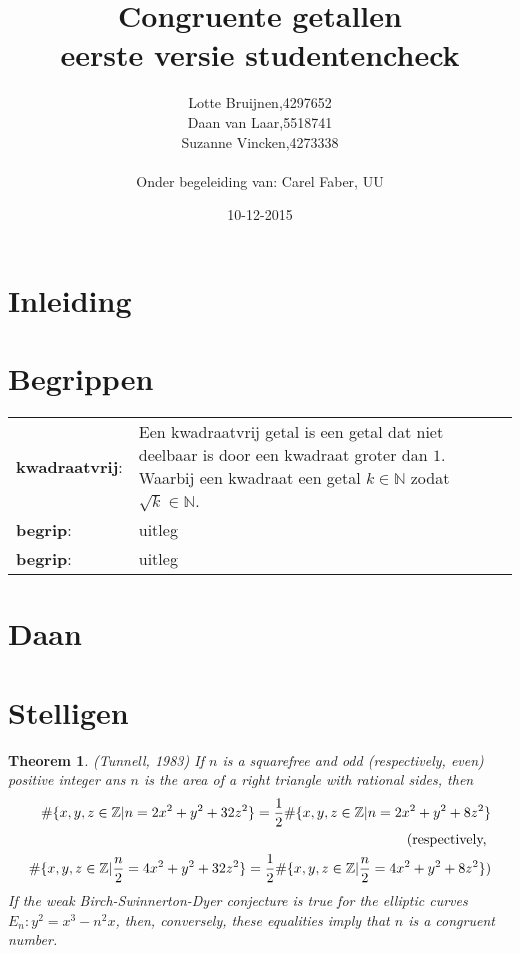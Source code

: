 \documentclass[12pt,reqno]{article}
\title{\textbf{Congruente getallen}\\
		\small{eerste versie studentencheck}}
\author{
	\begin{tabular}{ l l }
		Lotte Bruijnen, & 4297652 \\
		Daan van Laar, & 5518741 \\
		Suzanne Vincken, & 4273338
	\end{tabular}\\
	Onder begeleiding van: Carel Faber, UU
}
\date{10-12-2015}
\newcommand*{\NN}{\ensuremath{\mathbb{N}}}
\newcommand*{\ZZ}{\ensuremath{\mathbb{Z}}}
\begin{document}
	
	\maketitle
	\allowdisplaybreaks
	
	\section{Inleiding}
	
	\section{Begrippen}
	\begin{tabular}{ l p{10cm} }
		\textbf{kwadraatvrij}: \cite{Beukers} & Een kwadraatvrij getal is een getal dat niet deelbaar is door een kwadraat groter dan $1$. Waarbij een kwadraat een getal $k\in\NN$ zodat $\sqrt{k}\in\NN$.\\
		\textbf{begrip}: & uitleg \\
		\textbf{begrip}: & uitleg
	\end{tabular}
	
	\section{Daan}
	
	
	
	
	
	\section{Stelligen}
	
	\newtheorem{Tunnell}{Theorem}
	\begin{Tunnell}
		\cite{Koblitz} (Tunnell, 1983) If $n$ is a squarefree and odd (respectively, even) positive integer ans $n$ is the area of a right triangle with rational sides, then
		\begin{align}
		\#\{x,y,z\in\ZZ|n=2x^2+y^2+32z^2\} = \frac{1}{2}\#\{x,y,z\in\ZZ|n=2x^2+y^2+8z^2\}\\
		\notag \text{(respectively, } \\
		\#\{x,y,z\in\ZZ|\frac{n}{2}=4x^2+y^2+32z^2\} = \frac{1}{2}\#\{x,y,z\in\ZZ|\frac{n}{2}=4x^2+y^2+8z^2\})
		\end{align}
		If the weak Birch-Swinnerton-Dyer conjecture is true for the elliptic curves $E_n:y^2=x^3-n^2x$, then, conversely, these equalities imply that $n$ is a congruent number.
	\end{Tunnell}
	
\end{document}
